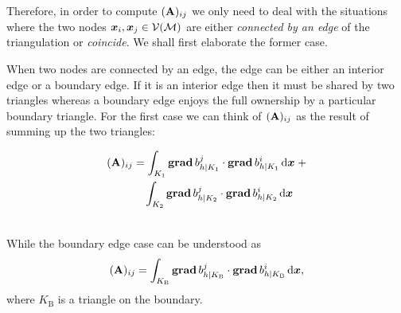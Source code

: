\begin{figure}[!htbp]
{			
		}
	\end{figure}

	Therefore, in order to compute $(\mathbf{A})_{ij}$ we only need to 
	deal with the situations where the two nodes $\bm{x}_i,\bm{x}_j\in
	\mathcal{V}(\mathcal{M})$ are either \emph{connected by an edge} of the 
	triangulation or \emph{coincide}.
	We shall first elaborate the former case.\vspace{8pt}
	
	When two nodes are connected by an edge, the edge can be either an 
	interior edge or a boundary edge. If it is an interior edge then it must
	be shared by two triangles whereas a boundary edge enjoys the full 
	ownership by a particular boundary triangle. For the first case we can
	think of $(\mathbf{A})_{ij}$ as the result of summing up the two triangles:
	
	\begin{minipage}{.5\textwidth}
		\begin{equation*}
		\begin{split}
		(\mathbf{A})_{ij}
		&=\int_{K_1}\mathbf{grad}\, b_{h|K_1}^j\cdot\mathbf{grad}\, b_{h|K_1}^i\, \mathrm{d}\bm{x}\;+\\
		&\quad \int_{K_2}\mathbf{grad}\, b_{h|K_2}^j\cdot\mathbf{grad}\, b_{h|K_2}^i\, \mathrm{d}\bm{x}		
		\end{split}
		\end{equation*}
	\end{minipage}%
	\begin{minipage}{.5\textwidth}
			
	\end{minipage}\\[8pt]	
	While the boundary edge case can be understood as
	\[(\mathbf{A})_{ij}
		=\int_{K_\mathrm{B}}\mathbf{grad}\, b_{h|K_\mathrm{B}}^j
			\cdot\mathbf{grad}\, b_{h|K_\mathrm{B}}^i\, \mathrm{d}\bm{x},\]
	where $K_\mathrm{B}$ is a triangle on the boundary.
	
